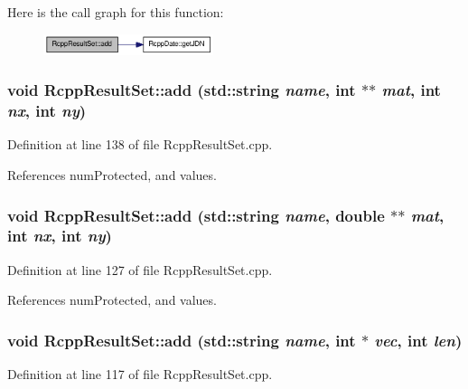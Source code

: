 Here is the call graph for this function:\nopagebreak
\begin{figure}[H]
\begin{center}
\leavevmode
\includegraphics[width=141pt]{classRcppResultSet_ae5cb861a0d6e95cc7ed465ccae2ac4a7_cgraph}
\end{center}
\end{figure}
\hypertarget{classRcppResultSet_a2cca9ea4e9554c4fad9bc326355c354c}{
\subsubsection[{add}]{\setlength{\rightskip}{0pt plus 5cm}void RcppResultSet::add (std::string {\em name}, \/  int $\ast$$\ast$ {\em mat}, \/  int {\em nx}, \/  int {\em ny})}}
\label{classRcppResultSet_a2cca9ea4e9554c4fad9bc326355c354c}


Definition at line 138 of file RcppResultSet.cpp.

References numProtected, and values.\hypertarget{classRcppResultSet_a88ff0e3db486eec0012eb58beee05e9b}{
\subsubsection[{add}]{\setlength{\rightskip}{0pt plus 5cm}void RcppResultSet::add (std::string {\em name}, \/  double $\ast$$\ast$ {\em mat}, \/  int {\em nx}, \/  int {\em ny})}}
\label{classRcppResultSet_a88ff0e3db486eec0012eb58beee05e9b}


Definition at line 127 of file RcppResultSet.cpp.

References numProtected, and values.\hypertarget{classRcppResultSet_a494dbe1f6db48bf48e9e33a32d897f29}{
\subsubsection[{add}]{\setlength{\rightskip}{0pt plus 5cm}void RcppResultSet::add (std::string {\em name}, \/  int $\ast$ {\em vec}, \/  int {\em len})}}
\label{classRcppResultSet_a494dbe1f6db48bf48e9e33a32d897f29}


Definition at line 117 of file RcppResultSet.cpp.

